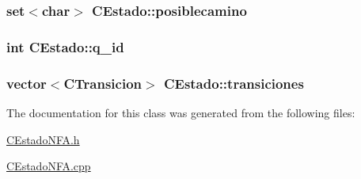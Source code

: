 \subsubsection[{\texorpdfstring{posiblecamino}{posiblecamino}}]{\setlength{\rightskip}{0pt plus 5cm}set$<$char$>$ C\+Estado\+::posiblecamino\hspace{0.3cm}{\ttfamily [private]}}\hypertarget{classCEstado_ac7e32bb24d14ad8f5b2d23e273087bd0}{}\label{classCEstado_ac7e32bb24d14ad8f5b2d23e273087bd0}
\subsubsection[{\texorpdfstring{q\+\_\+id}{q_id}}]{\setlength{\rightskip}{0pt plus 5cm}int C\+Estado\+::q\+\_\+id\hspace{0.3cm}{\ttfamily [private]}}\hypertarget{classCEstado_a2ff2cdec56804f70b389076be4501b4c}{}\label{classCEstado_a2ff2cdec56804f70b389076be4501b4c}
\subsubsection[{\texorpdfstring{transiciones}{transiciones}}]{\setlength{\rightskip}{0pt plus 5cm}vector$<${\bf C\+Transicion}$>$ C\+Estado\+::transiciones\hspace{0.3cm}{\ttfamily [private]}}\hypertarget{classCEstado_a5f904405b10b0826dd1749fdb9c6f302}{}\label{classCEstado_a5f904405b10b0826dd1749fdb9c6f302}


The documentation for this class was generated from the following files\+:\begin{DoxyCompactItemize}
\item 
\hyperlink{CEstadoNFA_8h}{C\+Estado\+N\+F\+A.\+h}\item 
\hyperlink{CEstadoNFA_8cpp}{C\+Estado\+N\+F\+A.\+cpp}\end{DoxyCompactItemize}
